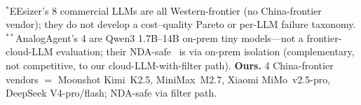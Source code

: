 \begin{table}[t]
  \\[0.4em]
  \begin{minipage}{0.95\linewidth}\footnotesize
  $^*$EEsizer's 8 commercial LLMs are all Western-frontier (no
  China-frontier vendor); they do not develop a cost--quality
  Pareto or per-LLM failure taxonomy.
  $^{**}$AnalogAgent's 4 are Qwen3 1.7B--14B on-prem tiny
  models---not a frontier-cloud-LLM evaluation; their NDA-safe
  \yes\ is via on-prem isolation (complementary, not competitive,
  to our cloud-LLM-with-filter path).
  \textbf{Ours.} 4 China-frontier vendors $=$ Moonshot Kimi~K2.5,
  MiniMax~M2.7, Xiaomi MiMo~v2.5-pro, DeepSeek V4-pro/flash;
  NDA-safe via filter path.
  \end{minipage}
\end{table}
